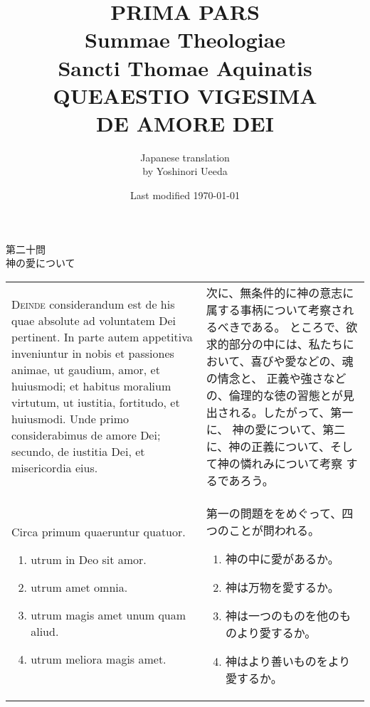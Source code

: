 \documentclass[10pt]{jsarticle} %
\title{{\bf PRIMA PARS}\\{\HUGE Summae Theologiae}\\Sancti Thomae
Aquinatis\\{\sffamily QUEAESTIO VIGESIMA}\\DE AMORE DEI}
\author{Japanese translation\\by Yoshinori {\sc Ueeda}}
\date{Last modified \today}
\begin{document}
\maketitle
\pagestyle{fancy}

\begin{center}
{\Large 第二十問\\神の愛について}
\end{center}


\begin{longtable}{p{21em}p{21em}}

{\Huge D}{\scshape einde} considerandum est de his quae absolute ad voluntatem Dei
 pertinent. In parte autem appetitiva inveniuntur in nobis et passiones
 animae, ut gaudium, amor, et huiusmodi; et habitus moralium virtutum,
 ut iustitia, fortitudo, et huiusmodi. Unde primo considerabimus de
 amore Dei; secundo, de iustitia Dei, et misericordia eius. 

&

次に、無条件的に神の意志に属する事柄について考察されるべきである。
ところで、欲求的部分の中には、私たちにおいて、喜びや愛などの、魂の情念と、
 正義や強さなどの、倫理的な徳の習態とが見出される。したがって、第一に、
 神の愛について、第二に、神の正義について、そして神の憐れみについて考察
 するであろう。


\\

Circa primum
 quaeruntur quatuor. 

\begin{enumerate}
 \item utrum in Deo sit amor.
 \item utrum amet omnia.
 \item utrum magis amet unum quam aliud.
 \item utrum meliora magis amet.
\end{enumerate}

&

第一の問題ををめぐって、四つのことが問われる。
\begin{enumerate}
 \item 神の中に愛があるか。
 \item 神は万物を愛するか。
 \item 神は一つのものを他のものより愛するか。
 \item 神はより善いものをより愛するか。
\end{enumerate}

\\

\end{longtable}
\end{document}
